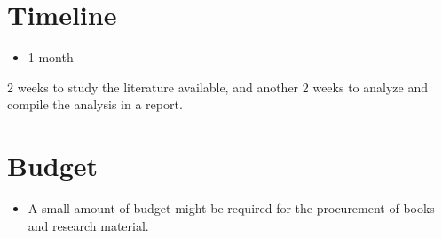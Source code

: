 \documentclass{article}
\begin{document}
\section*{Timeline}

\begin{itemize}
\item 1 month
\end{itemize}

2 weeks to study the literature available, and another 2 weeks to analyze and
compile the analysis in a report.


\section*{Budget}

\begin{itemize}
\item A small amount of budget might be required for the procurement of books and
  research material.
\end{itemize}



\end{document}
